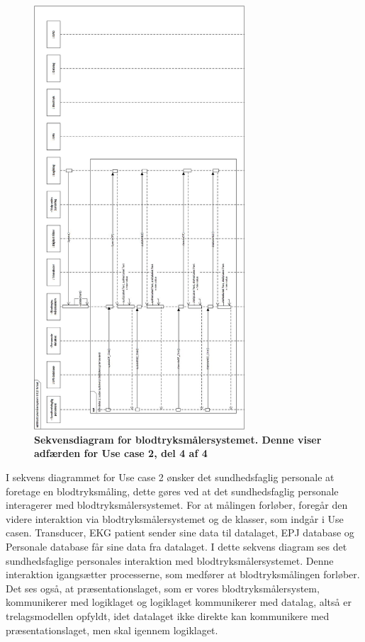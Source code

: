 \begin{figure}[H]
\includegraphics[width =0.7\textwidth , center]{billeder/sdUC2_4}
\caption{\textbf{Sekvensdiagram for blodtryksmålersystemet. Denne viser adfærden for Use case 2, del 4 af 4}}
\end{figure}
I sekvens diagrammet for Use case 2 ønsker det sundhedsfaglig personale at foretage en blodtryksmåling, dette gøres ved at det sundhedsfaglig personale interagerer med blodtryksmålersystemet. For at målingen forløber, foregår den videre interaktion via blodtryksmålersystemet og de klasser, som indgår i Use casen. Transducer, EKG patient sender sine data til datalaget, EPJ database og Personale database får sine data fra datalaget. I dette sekvens diagram ses det sundhedsfaglige personales interaktion med blodtryksmålersystemet. Denne interaktion igangsætter processerne, som medfører at blodtryksmålingen forløber. Det ses også, at præsentationslaget, som er vores blodtryksmålersystem, kommunikerer med logiklaget og logiklaget kommunikerer med datalag, altså er trelagsmodellen opfyldt, idet datalaget ikke direkte kan kommunikere med præsentationslaget, men skal igennem logiklaget. \\\\
